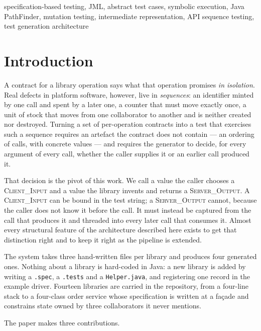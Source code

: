 \documentclass[conference]{IEEEtran}
\begin{document}
\begin{IEEEkeywords}
specification-based testing, JML, abstract test cases, symbolic execution, Java
PathFinder, mutation testing, intermediate representation, API sequence testing,
test generation architecture
\end{IEEEkeywords}

\section{Introduction}

A contract for a library operation says what that operation promises \emph{in
isolation}. Real defects in platform software, however, live in \emph{sequences}:
an identifier minted by one call and spent by a later one, a counter that must move
exactly once, a unit of stock that moves from one collaborator to another and is
neither created nor destroyed. Turning a set of per-operation contracts into a test
that exercises such a sequence requires an artefact the contract does not contain
--- an ordering of calls, with concrete values --- and requires the generator to
decide, for every argument of every call, whether the caller supplies it or an
earlier call produced it.

That decision is the pivot of this work. We call a value the caller chooses a
\textsc{Client\_Input} and a value the library invents and returns a
\textsc{Server\_Output}. A \textsc{Client\_Input} can be bound in the test string;
a \textsc{Server\_Output} cannot, because the caller does not know it before the
call. It must instead be captured from the call that produces it and threaded into
every later call that consumes it. Almost every structural feature of the
architecture described here exists to get that distinction right and to keep it
right as the pipeline is extended.

The system takes three hand-written files per library and produces four generated
ones. Nothing about a library is hard-coded in Java: a new library is added by
writing a \texttt{.spec}, a \texttt{.tests} and a \texttt{Helper.java}, and
registering one record in the example driver. Fourteen libraries are carried in the
repository, from a four-line stack to a four-class order service whose
specification is written at a fa\c{c}ade and constrains state owned by three
collaborators it never mentions.

The paper makes three contributions.
\end{document}
